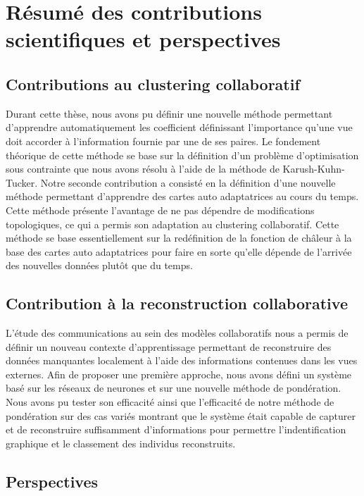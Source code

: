 \section{Résumé des contributions scientifiques et perspectives}

\subsection{Contributions au clustering collaboratif}

Durant cette thèse, nous avons pu définir une nouvelle méthode permettant d'apprendre automatiquement les coefficient définissant l'importance qu'une vue doit accorder à l'information fournie par une de ses paires. Le fondement théorique de cette méthode se base sur la définition d'un problème d'optimisation sous contrainte que nous avons résolu à l'aide de la méthode de Karush-Kuhn-Tucker.
Notre seconde contribution a consisté en la définition d'une nouvelle méthode permettant d'apprendre des cartes auto adaptatrices au cours du temps. Cette méthode présente l'avantage de ne pas dépendre de modifications topologiques, ce qui a permis son adaptation au clustering collaboratif. Cette méthode se base essentiellement sur la redéfinition de la fonction de châleur à la base des cartes auto adaptatrices pour faire en sorte qu'elle dépende de l'arrivée des nouvelles données plutôt que du temps.

\subsection{Contribution à la reconstruction collaborative}

L'étude des communications au sein des modèles collaboratifs nous a permis de définir un nouveau contexte d'apprentissage permettant de reconstruire des données manquantes localement à l'aide des informations contenues dans les vues externes. Afin de proposer une première approche, nous avons défini un système basé sur les réseaux de neurones et sur une nouvelle méthode de pondération. Nous avons pu tester son efficacité ainsi que l'efficacité de notre méthode de pondération sur des cas variés montrant que le système était capable de capturer et de reconstruire suffisamment d'informations pour permettre l'indentification graphique et le classement des individus reconstruits.

\subsection{Perspectives}

